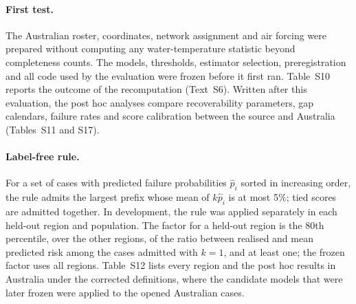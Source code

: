 \documentclass[draft]{agujournal2025}
\begin{document}
\paragraph{First test.} The Australian roster, coordinates, network assignment and air forcing were prepared without computing any water-temperature statistic beyond completeness counts. The models, thresholds, estimator selection, preregistration and all code used by the evaluation were frozen before it first ran. Table~S10 reports the outcome of the recomputation (Text~S6). Written after this evaluation, the post hoc analyses compare recoverability parameters, gap calendars, failure rates and score calibration between the source and Australia (Tables~S11 and S17).

\paragraph{Label-free rule.} For a set of cases with predicted failure probabilities $\hat p_i$ sorted in increasing order, the rule admits the largest prefix whose mean of $k\hat p_i$ is at most 5\%; tied scores are admitted together. In development, the rule was applied separately in each held-out region and population. The factor for a held-out region is the 80th percentile, over the other regions, of the ratio between realised and mean predicted risk among the cases admitted with $k=1$, and at least one; the frozen factor uses all regions. Table~S12 lists every region and the post hoc results in Australia under the corrected definitions, where the candidate models that were later frozen were applied to the opened Australian cases.
\end{document}
